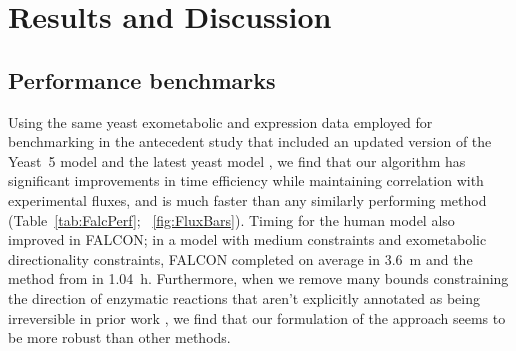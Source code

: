 


\section{Results and Discussion}

\subsection{Performance benchmarks}
Using the same yeast exometabolic and expression data employed for
benchmarking in the antecedent study \citep{Lee2012} that included an
updated version of the Yeast~5 model \citep{Heavner2012} and the latest
yeast model \citep{Aung2013}, we find that
our algorithm has significant improvements in time efficiency while
maintaining correlation with experimental fluxes, and is much faster 
than any similarly performing method (Table~\ref{tab:FalcPerf}; 
\suppOrApp \Fig~\ref{fig:FluxBars}).
Timing for the human model also improved in FALCON; in a model with
medium constraints and exometabolic directionality constraints, FALCON
completed on average in 3.6~m and the method from \citealt{Lee2012} in
1.04~h. Furthermore, when we remove many bounds constraining the
direction of enzymatic reactions that aren't explicitly annotated as
being irreversible in prior work \citep{Lee2012}, we find that our
formulation of the approach seems to be more robust than other
methods.


